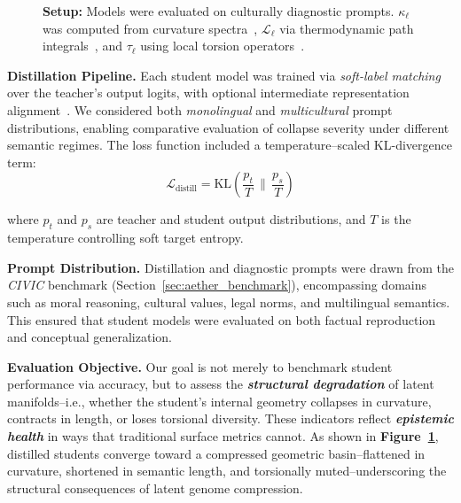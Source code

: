 \begin{figure}[ht!]
{\textbf{Setup:} Models were evaluated on culturally diagnostic prompts. $\kappa_\ell$ was computed from curvature spectra~\cite{bernstein2004differential}, $\mathcal{L}_\ell$ via thermodynamic path integrals~\cite{crooks1999entropy}, and $\tau_\ell$ using local torsion operators~\cite{spivak1970comprehensive}.
}
\label{fig:knowledge-distillation-ndna}
\end{figure}



\vspace{0.75em}
\noindent \textbf{Distillation Pipeline.} Each student model was trained via \emph{soft-label matching} over the teacher’s output logits, with optional intermediate representation alignment~\citep{gou2021knowledge, rashid2021mate}. We considered both \emph{monolingual} and \emph{multicultural} prompt distributions, enabling comparative evaluation of collapse severity under different semantic regimes. The loss function included a temperature--scaled KL-divergence term:
\[
\mathcal{L}_{\text{distill}} = \mathrm{KL}\left( \frac{p_t}{T} \,\Big\|\, \frac{p_s}{T} \right)
\]

where $p_t$ and $p_s$ are teacher and student output distributions, and $T$ is the temperature controlling soft target entropy.

\vspace{0.75em}
\noindent \textbf{Prompt Distribution.} Distillation and diagnostic prompts were drawn from the \emph{CIVIC} benchmark (Section~\ref{sec:aether_benchmark}), encompassing domains such as moral reasoning, cultural values, legal norms, and multilingual semantics. This ensured that student models were evaluated on both factual reproduction and conceptual generalization.

\vspace{0.75em}
\noindent \textbf{Evaluation Objective.} Our goal is not merely to benchmark student performance via accuracy, but to assess the \textbf{\emph{structural degradation}} of latent manifolds--i.e., whether the student’s internal geometry collapses in curvature, contracts in length, or loses torsional diversity. These indicators reflect \textbf{\emph{epistemic health}} in ways that traditional surface metrics cannot. As shown in \textbf{Figure~\ref{fig:knowledge-distillation-ndna}}, distilled students converge toward a compressed geometric basin--flattened in curvature, shortened in semantic length, and torsionally muted--underscoring the structural consequences of latent genome compression.






